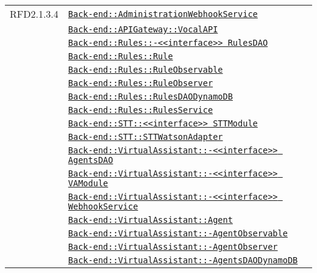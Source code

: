 \begin{longtable}{|>{\centering}m{3cm}|m{10cm}<{\centering}|}
RFD2.1.3.4 & \hyperref[Back-end::AdministrationWebhookService]{\texttt{Back-end::AdministrationWebhookService}}\\
& \hyperref[Back-end::APIGateway::VocalAPI]{\texttt{Back-end::APIGateway::VocalAPI}}\\
& \hyperref[Back-end::Rules::<<interface>> RulesDAO]{\texttt{Back-end::Rules::-\linebreak <<interface>> RulesDAO}}\\
& \hyperref[Back-end::Rules::Rule]{\texttt{Back-end::Rules::Rule}}\\
& \hyperref[Back-end::Rules::RuleObservable]{\texttt{Back-end::Rules::RuleObservable}}\\
& \hyperref[Back-end::Rules::RuleObserver]{\texttt{Back-end::Rules::RuleObserver}}\\
& \hyperref[Back-end::Rules::RulesDAODynamoDB]{\texttt{Back-end::Rules::RulesDAODynamoDB}}\\
& \hyperref[Back-end::Rules::RulesService]{\texttt{Back-end::Rules::RulesService}}\\
& \hyperref[Back-end::STT::<<interface>> STTModule]{\texttt{Back-end::STT::<<interface>> STTModule}}\\
& \hyperref[Back-end::STT::STTWatsonAdapter]{\texttt{Back-end::STT::STTWatsonAdapter}}\\
& \hyperref[Back-end::VirtualAssistant::<<interface>> AgentsDAO]{\texttt{Back-end::VirtualAssistant::-\linebreak <<interface>> AgentsDAO}}\\
& \hyperref[Back-end::VirtualAssistant::<<interface>> VAModule]{\texttt{Back-end::VirtualAssistant::-\linebreak <<interface>> VAModule}}\\
& \hyperref[Back-end::VirtualAssistant::<<interface>> WebhookService]{\texttt{Back-end::VirtualAssistant::-\linebreak <<interface>> WebhookService}}\\
& \hyperref[Back-end::VirtualAssistant::Agent]{\texttt{Back-end::VirtualAssistant::Agent}}\\
& \hyperref[Back-end::VirtualAssistant::AgentObservable]{\texttt{Back-end::VirtualAssistant::-\linebreak AgentObservable}}\\
& \hyperref[Back-end::VirtualAssistant::AgentObserver]{\texttt{Back-end::VirtualAssistant::-\linebreak AgentObserver}}\\
& \hyperref[Back-end::VirtualAssistant::AgentsDAODynamoDB]{\texttt{Back-end::VirtualAssistant::-\linebreak AgentsDAODynamoDB}}\\

\end{longtable}
